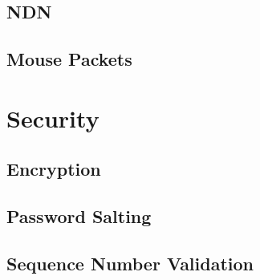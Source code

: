 \documentclass{sig-alternate}
\renewcommand\_{\textunderscore\allowbreak}  %
\begin{document}
\subsection{NDN}


\subsection{Mouse Packets}

\section{Security}

\subsection{Encryption}

\subsection{Password Salting}

\subsection{Sequence Number Validation}
\end{document}
